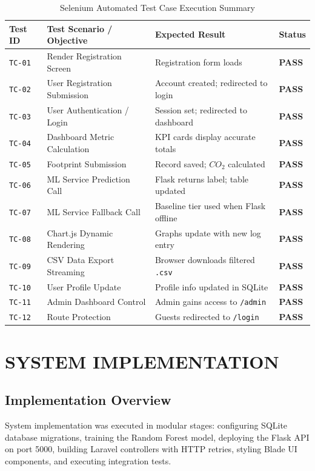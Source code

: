 \documentclass[12pt,a4paper]{report}
\begin{document}
\begin{table}[h]
\caption{Selenium Automated Test Case Execution Summary}
\label{tab:selenium}
\centering
\begin{tabular}{llll}
\toprule
\textbf{Test ID} & \textbf{Test Scenario / Objective} & \textbf{Expected Result} & \textbf{Status} \\
\midrule
\texttt{TC-01} & Render Registration Screen & Registration form loads & \textbf{PASS} \\
\texttt{TC-02} & User Registration Submission & Account created; redirected to login & \textbf{PASS} \\
\texttt{TC-03} & User Authentication / Login & Session set; redirected to dashboard & \textbf{PASS} \\
\texttt{TC-04} & Dashboard Metric Calculation & KPI cards display accurate totals & \textbf{PASS} \\
\texttt{TC-05} & Footprint Submission & Record saved; $CO_2$ calculated & \textbf{PASS} \\
\texttt{TC-06} & ML Service Prediction Call & Flask returns label; table updated & \textbf{PASS} \\
\texttt{TC-07} & ML Service Fallback Call & Baseline tier used when Flask offline & \textbf{PASS} \\
\texttt{TC-08} & Chart.js Dynamic Rendering & Graphs update with new log entry & \textbf{PASS} \\
\texttt{TC-09} & CSV Data Export Streaming & Browser downloads filtered \texttt{.csv} & \textbf{PASS} \\
\texttt{TC-10} & User Profile Update & Profile info updated in SQLite & \textbf{PASS} \\
\texttt{TC-11} & Admin Dashboard Control & Admin gains access to \texttt{/admin} & \textbf{PASS} \\
\texttt{TC-12} & Route Protection & Guests redirected to \texttt{/login} & \textbf{PASS} \\
\bottomrule
\end{tabular}
\end{table}

\chapter{SYSTEM IMPLEMENTATION}

\section{Implementation Overview}
System implementation was executed in modular stages: configuring SQLite database migrations, training the Random Forest model, deploying the Flask API on port 5000, building Laravel controllers with HTTP retries, styling Blade UI components, and executing integration tests.
\end{document}
